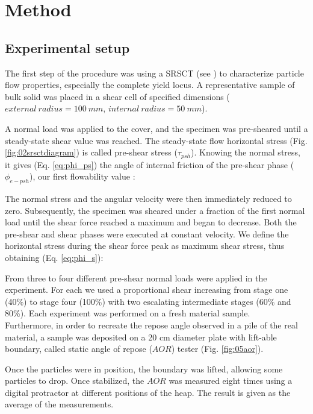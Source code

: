 \section{Method}
\label{sec:method}


\subsection{Experimental setup}
\label{subsec:experimentalsetup}

The first step of the procedure was using a SRSCT (see \cite{RefWorks:142}) to characterize particle flow properties, especially the complete yield locus.
A representative sample of bulk solid was placed in a shear cell of specified dimensions ($external ~ radius = 100 ~ mm$, $internal ~ radius = 50 ~ mm$). 

A normal load was applied to the cover, and the specimen was pre-sheared  until a steady-state shear value was reached.
 The steady-state flow horizontal stress (Fig. \ref{fig:02srsctdiagram}) is
called pre-shear stress ($\tau_{psh}$). Knowing the normal stress, it gives (Eq. \ref{eq:phi_ps}) the angle of internal friction of the pre-shear phase 
($\phi_{e-psh}$), our first flowability value \cite{RefWorks:118}:
 

The normal stress and the angular velocity were then immediately reduced to zero. 
Subsequently, the specimen was sheared under a fraction of the first normal load until the shear force reached a maximum and began to decrease. 
Both the pre-shear and shear phases were executed at constant velocity. We define the horizontal stress during the shear force peak as maximum shear stress, 
thus obtaining (Eq. \ref{eq:phi_s})\cite{RefWorks:118}:
 
From three to four different pre-shear normal loads were applied in the experiment. For each we used
a proportional shear increasing from stage one (40\%) to stage four (100\%) with two escalating intermediate stages (60\% and 80\%).
Each experiment was performed on a fresh material sample. \\
Furthermore, in order to recreate the repose angle observed in a pile of the real material, a sample was deposited on a 20 cm diameter plate 
with lift-able boundary, called static angle of repose ($AOR$) tester (Fig. \ref{fig:05aor}).

Once the particles were in position, the boundary was lifted, allowing some
particles to drop. Once stabilized, the $AOR$ was measured eight times using a digital protractor at different positions of the heap. The result is given as the average of the measurements.



